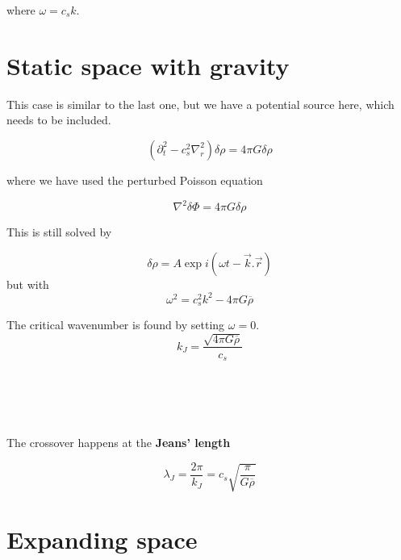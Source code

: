 \documentclass[a4,12pt,oneside]{report}
\begin{document}
	where $ \omega = c_s k  $.
	\begin{center}
	\end{center}
	
	\section{Static space with gravity}
	This case is similar to the last one, but we have a potential source here, which needs to be included. 
	
	\begin{equation}\label{key}
	(\partial_t^2 - c_s^2 \nabla_r^2)\delta \rho = 4 \pi G \delta \rho
	\end{equation}
	
	where we have used the perturbed Poisson equation
	
	\begin{equation}\label{key}
	\nabla^2 \delta \Phi = 4 \pi G \delta \rho
	\end{equation}
	
	This is still solved by 
	
	\begin{equation}\label{key}
	\delta \rho = A \exp i(\omega t - \vec{k}.\vec{r})
	\end{equation}
	but with
	\begin{equation}\label{key}
	\omega^2 = c_s^2 k ^2 - 4 \pi G \overline{\rho}
	\end{equation}
	
	The critical wavenumber is found by setting $ \omega = 0 $.
	\begin{equation}\label{key}
	k_J = \frac{\sqrt{4 \pi G \overline{\rho}}}{c_s}
	\end{equation}
	
	\\\\
   	\\\\	
	The crossover happens at the {\bf Jeans' length}
	
	\begin{equation}
	\boxed{\lambda_J = \frac{2 \pi}{k_J} = c_s\sqrt{\frac{\pi}{G\overline{\rho}}}}
	\end{equation}
	
	
	\section{Expanding space}
	
\end{document}
